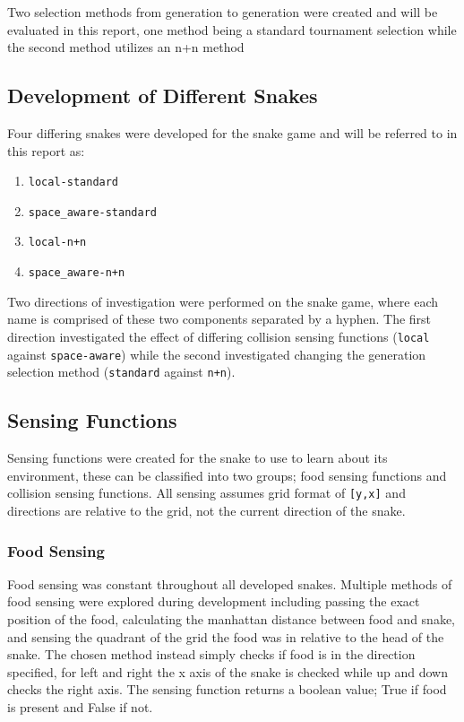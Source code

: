 Two selection methods from generation to generation were created and will be evaluated in this report, one method being a standard tournament selection while the second method utilizes an n+n method 

\subsection{Development of Different Snakes}
Four differing snakes were developed for the snake game and will be referred to in this report as:
\begin{enumerate}
  \item \verb|local-standard|
  \item \verb|space_aware-standard|
  \item \verb|local-n+n|
  \item \verb|space_aware-n+n|
\end{enumerate}
Two directions of investigation were performed on the snake game, where each name is comprised of these two components separated by a hyphen. The first direction investigated the effect of differing collision sensing functions (\verb|local| against \verb|space-aware|) while the second investigated changing the generation selection method (\verb|standard| against \verb|n+n|).

\subsection{Sensing Functions}
Sensing functions were created for the snake to use to learn about its environment, these can be classified into two groups; food sensing functions and collision sensing functions. All sensing assumes grid format of \verb|[y,x]| and directions are relative to the grid, not the current direction of the snake.

\subsubsection{Food Sensing}
Food sensing was constant throughout all developed snakes. Multiple methods of food sensing were explored during development including passing the exact position of the food, calculating the manhattan distance between food and snake, and sensing the quadrant of the grid the food was in relative to the head of the snake. The chosen method instead simply checks if food is in the direction specified, for left and right the x axis of the snake is checked while up and down checks the right axis. The sensing function returns a boolean value; True if food is present and False if not. 


